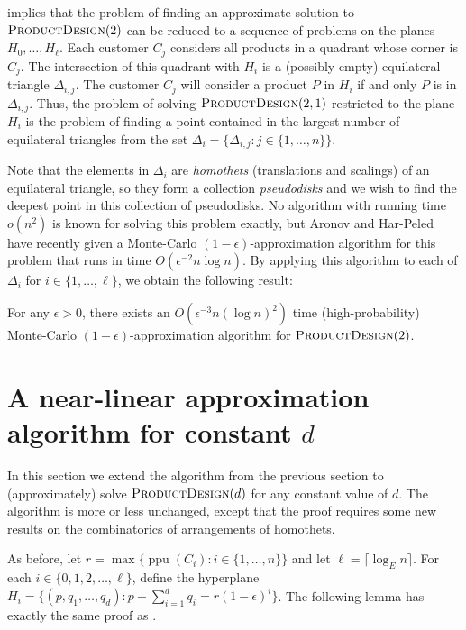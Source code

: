 \documentclass[lotsofwhite]{patmorin}
\newcommand{\ppu}{\operatorname{ppu}}
\newcommand{\eps}{\epsilon}
\begin{document}
 implies that the problem of finding an approximate
solution to  $\textsc{ProductDesign}(2)$ can be reduced to a sequence of
problems on the planes $H_0,\ldots,H_\ell$.  Each customer $C_j$ considers
all products in a quadrant whose corner is $C_j$.   The intersection of
this quadrant with $H_i$ is a (possibly empty) equilateral triangle
$\Delta_{i,j}$.  The customer $C_j$ will consider a product $P$ in $H_i$ if
and only $P$ is in $\Delta_{i,j}$.  Thus, the problem of solving
$\textsc{ProductDesign}(2,1)$ restricted to the plane $H_i$ is the problem
of finding a point contained in the largest number of equilateral triangles
from the set $\Delta_i=\{\Delta_{i,j}: j\in\{1,\ldots,n\}\}$.

Note that the elements in $\Delta_i$ are \emph{homothets} (translations and
scalings) of an equilateral triangle, so they form a collection
\emph{pseudodisks} and we wish to find the deepest point in this collection
of pseudodisks.  No algorithm with running time $o(n^2)$ is known for
solving this problem exactly, but Aronov and Har-Peled \cite{ah08} have
recently given a Monte-Carlo $(1-\eps)$-approximation algorithm for this
problem that runs in time $O(\eps^{-2}n\log n)$.  By applying this
algorithm to each of $\Delta_i$ for $i\in\{1,\ldots,\ell\}$, we obtain the
following result:

\begin{thm}
  For any $\eps >0$, there exists an $O(\eps^{-3}n(\log n)^2)$ time
  (high-probability) Monte-Carlo $(1-\eps)$-approximation algorithm for
  $\textsc{ProductDesign}(2)$.
\end{thm}

\section{A near-linear approximation algorithm for constant $d$}

In this section we extend the algorithm from the previous section to
(approximately) solve $\textsc{ProductDesign}(d)$ for any constant value of
$d$.  The algorithm is more or less unchanged, except that the proof
requires some new results on the combinatorics of arrangements of
homothets.

As before, let $r=\max\{\ppu(C_i) : i\in\{1,\ldots, n\}\}$ and let
$\ell = \lceil\log_E n\rceil$. For each $i\in\{0,1,2,\ldots,\ell\}$,
define the hyperplane $H_i = \{ (p,q_1,\ldots,q_d) : p-\sum_{i=1}^d
q_i =  r(1-\eps)^i \}$.  The following lemma has exactly the same proof
as .
\end{document}
